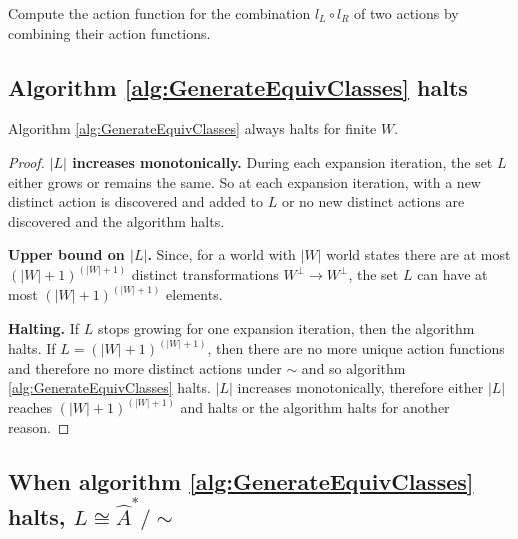 \begin{algorithm}[H]
	\caption{
		Compute the action function for the combination $l_{L} \circ l_{R}$ of two actions by combining their action functions.
	}
	\hrulefill
	\begin{algorithmic}[1]
		\EndProcedure
	\end{algorithmic}
\end{algorithm}


\subsection{Algorithm \ref{alg:GenerateEquivClasses} halts}

\begin{proposition}
    Algorithm \ref{alg:GenerateEquivClasses} always halts for finite $W$.
\end{proposition}
\begin{proof}
    \textbf{$|L|$ increases monotonically.}
    During each expansion iteration, the set $L$ either grows or remains the same.
    So at each expansion iteration, with a new distinct action is discovered and added to $L$ or no new distinct actions are discovered and the algorithm halts.

    \textbf{Upper bound on $|L|$.}
    Since, for a world with $|W|$ world states there are at most $(|W| + 1)^(|W| + 1)$ distinct transformations $W^{\bot} \to W^{\bot}$, the set $L$ can have at most $(|W| + 1)^(|W| + 1)$ elements.

    \textbf{Halting.}
    If $L$ stops growing for one expansion iteration, then the algorithm halts.
    If $L = (|W| + 1)^(|W| + 1)$, then there are no more unique action functions and therefore no more distinct actions under $\sim$ and so  algorithm \ref{alg:GenerateEquivClasses} halts.
    $|L|$ increases monotonically, therefore either $|L|$ reaches $(|W| + 1)^(|W| + 1)$ and halts or the algorithm halts for another reason.
\end{proof}

\subsection{When algorithm \ref{alg:GenerateEquivClasses} halts, $L \cong \hat{A}^{*}/\sim$}

